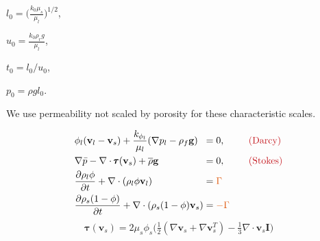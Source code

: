 \documentclass[usenames,dvipsnames,letterpaper,landscape,final]{slides}
\theoremstyle{definition}
\begin{document}
\begin{myslide}
\parbox{0.5\textwidth}{\raggedright
{}
\begin{blist}
\item $l_0 = \Big( \frac{k_0 \mu_s}{\mu_l} \Big)^{1/2}$,
\item $u_0 = \frac{k_0 \rho_r g}{\mu_l}$,
\item $t_0 = l_0/u_0$,
\item $p_0 = \rho g l_0$.
\end{blist}
}\parbox{0.5\textwidth}{\raggedright
{}
We use permeability  not scaled by porosity for these characteristic scales.
}

\end{myslide}

\begin{myslide}
		  \begin{center}
		  \end{center}
\begin{equation*}
\begin{alignedat}{3}
		  &\phi_l (\mathbf{v}_l - \mathbf{v}_s)
		  + \frac{k_{\phi_l}}{\mu_l}(\nabla p_l - \rho_f\mathbf{g})
	    &&= 0, \qquad &&\Maroon{\text{(Darcy)}}\\
		  &\nabla\bar p - \nabla \cdot \pmb{\tau}(\mathbf{v}_s) + \overline{\rho}\mathbf{g}&&= 0, \qquad &&\Maroon{\text{(Stokes)}}\\
&\frac{\partial \rho_l \phi}{\partial t} + \nabla\cdot (\rho_l \phi \mathbf{v}_l) &&= \Oorange{\Gamma}  \qquad && \\
&\frac{\partial \rho_s (1-\phi)}{\partial t} + \nabla\cdot (\rho_s (1-\phi) \mathbf{v}_s) &&= \Oorange{-\Gamma}  \qquad && 
\end{alignedat}
\end{equation*}
\begin{equation*}\label{eq:deviatoricstress}
		  \pmb{\tau}(\mathbf{v}_s)
		  = 2\mu_s\phi_s\big( \tfrac{1}{2}(\nabla \mathbf{v}_s + \nabla \mathbf{v}_s^T) - \tfrac{1}{3}\nabla \cdot \mathbf{v}_s \mathbf{I}\big)
\end{equation*}


\end{myslide}
\end{document}
